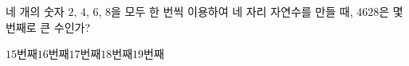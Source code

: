 \hspace*{2mm}\begin{minipage}[t]{\dimexpr\linewidth-2mm\relax}\vspace{0pt}
네 개의 숫자 $2$, $4$, $6$, $8$을 모두 한 번씩 이용하여 네 자리 자연수를 만들 때, $4628$은 몇 번째로 큰 수인가?
\begin{choices32}{$15$번째}{$16$번째}{$17$번째}{$18$번째}{$19$번째}\end{choices32}\end{minipage}
